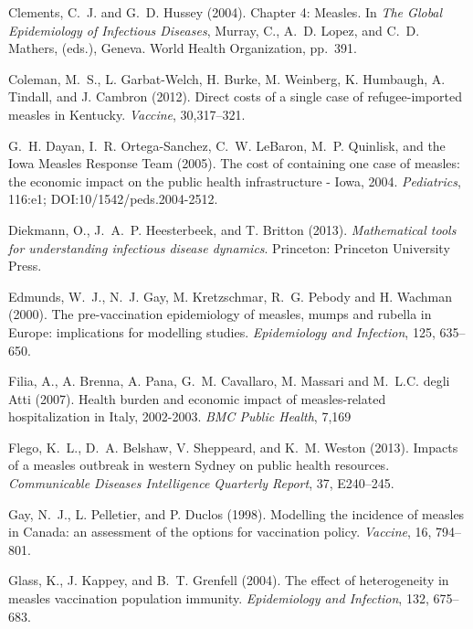 \documentclass{article}
\begin{document}
\begin{thebibliography}{}
Clements, C.~J. and G.~D. Hussey (2004).
\newblock Chapter 4: Measles.
\newblock In \emph{The Global Epidemiology of Infectious Diseases},  Murray, C., A.~D. Lopez, and C.~D. Mathers, (eds.), Geneva.
World Health Organization, pp.~391.

Coleman, M.~S., L. Garbat-Welch, H. Burke, M. Weinberg, K. Humbaugh, A. Tindall, and J. Cambron (2012).
\newblock Direct costs of a single case of refugee-imported measles in Kentucky.
\newblock \emph{Vaccine}, 30,317--321.

G.~H. Dayan, I.~R. Ortega-Sanchez, C.~W. LeBaron, M.~P. Quinlisk, and the Iowa Measles Response Team (2005).
\newblock The cost of containing one case of measles: the economic impact on the public health infrastructure - Iowa, 2004.
\newblock \emph{Pediatrics}, 116:e1; DOI:10/1542/peds.2004-2512.

Diekmann, O.,  J.~A.~P. Heesterbeek, and T. Britton (2013).
\newblock \emph{Mathematical tools for understanding infectious disease dynamics}.
Princeton: Princeton University Press.

Edmunds, W.~J., N.~J. Gay, M. Kretzschmar, R.~G. Pebody and H. Wachman (2000).
\newblock The pre-vaccination epidemiology of measles, mumps and rubella in Europe: implications for modelling studies.
\newblock \emph{Epidemiology and Infection}, 125, 635--650.

Filia, A., A. Brenna, A. Pana, G.~M. Cavallaro, M. Massari and M.~L.C. degli Atti (2007).
\newblock Health burden and economic impact of measles-related hospitalization in Italy, 2002-2003.
\newblock \emph{BMC Public Health}, 7,169

Flego, K.~L., D.~A. Belshaw, V. Sheppeard, and K.~M. Weston (2013).
\newblock Impacts of a measles outbreak in western Sydney on public health resources.
\newblock \emph{Communicable Diseases Intelligence Quarterly Report}, 37, E240--245.

Gay, N.~J., L. Pelletier, and P. Duclos (1998).
\newblock Modelling the incidence of measles in Canada: an assessment of the options for vaccination policy.
\newblock \emph{Vaccine}, 16, 794--801.

Glass, K., J. Kappey, and B.~T. Grenfell (2004).
\newblock The effect of heterogeneity in measles vaccination population immunity.
\newblock \emph{Epidemiology and Infection}, 132, 675--683.


\end{thebibliography}
\end{document}
